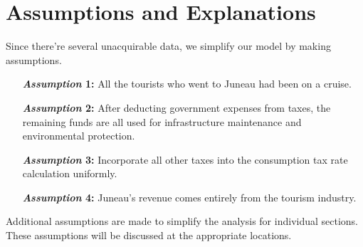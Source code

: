 \documentclass[12pt]{article}  %
\begin{document}
 
 \section{Assumptions and Explanations}
 
Since there're several unacquirable data, we simplify our model by making assumptions.
 
 \begin{itemize}
     \setlength{\parsep}{0ex} %
     \setlength{\topsep}{2ex} %
     \setlength{\itemsep}{1ex} %
     \item[\bfseries \textit{Assumption} 1:] All the tourists who went to Juneau had been on a cruise.
     \vspace{1ex}
     \item[\bfseries \textit{Assumption} 2:] After deducting government expenses from taxes, the remaining funds are all used for infrastructure maintenance and environmental protection.
     \vspace{1ex}
     \item[\bfseries \textit{Assumption} 3:] Incorporate all other taxes into the consumption tax rate calculation uniformly.
     \vspace{1ex}
     \item[\bfseries \textit{Assumption} 4:] Juneau's revenue comes entirely from the tourism industry.
 \end{itemize}
 
 Additional assumptions are made to simplify the analysis for individual sections. These assumptions will be discussed at the appropriate locations.
 
\end{document}

